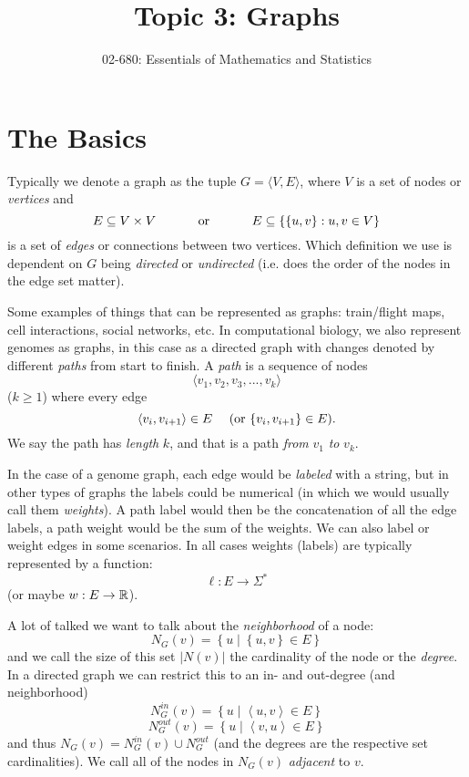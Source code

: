 


\title{Topic 3: Graphs}
\author{02-680: Essentials of Mathematics and Statistics}


\maketitle

\section{The Basics}
Typically we denote a graph as the tuple $G=\langle V, E\rangle$, 
where $V$ is a set of nodes or \emph{vertices} and 
\[E\subseteq V\times V \textnormal{\hspace{3em} or \hspace{3em}} E\subseteq \left\{\left\{u,v\right\} : u,v \in V\right\}\] 
is a set of \emph{edges} or connections between two vertices.
Which definition we use is dependent on $G$ being \emph{directed} or \emph{undirected} (i.e. does the order of the nodes in the edge set matter).  

Some examples of things that can be represented as graphs: train/flight maps, cell interactions, social networks, etc. 
In computational biology, we also represent genomes as graphs, in this case as a directed graph with changes denoted by different \emph{paths} from start to finish. 
A \textit{path} is a sequence of nodes \[\langle v_1, v_2, v_3,...,v_k \rangle\] ($k\ge 1$) where every edge \[\langle v_{i}, v_{i+1}\rangle \in E\textnormal{\hspace{1em} (or  }\{ v_{i}, v_{i+1}\} \in E\textnormal{).}\]
We say the path has \emph{length} $k$, and that is a path \textit{from} $v_1$ \textit{to} $v_k$.

In the case of a genome graph, each edge would be \emph{labeled} with a string, but in other types of graphs the labels could be numerical 
(in which we would usually call them \textit{weights}).
A path label would then be the concatenation of all the edge labels, a path weight would be the sum of the weights. 
We can also label or weight edges in some scenarios. 
In all cases weights (labels) are typically represented by a function:
\[\ell: E \rightarrow \Sigma^* \]
(or maybe $w: E \rightarrow \operatorname{\mathbb{R}}$).

A lot of talked we want to talk about the \emph{neighborhood} of a node: 
\[N_G(v) = \left\{ u \mid \left\{u,v\right\} \in E\right\}\]
and we call the size of this set $\left|N(v)\right|$ the cardinality of the node or the \emph{degree}. 
In a directed graph we can restrict this to an in- and out-degree (and neighborhood)
\[N^{in}_G(v) = \left\{ u \mid \left\langle u,v\right\rangle \in E\right\}\]
\[N^{out}_G(v) = \left\{ u \mid \left\langle v,u\right\rangle \in E\right\}\]
and thus $N_G(v) = N^{in}_G(v) \cup N^{out}_G$ (and the degrees are the respective set cardinalities). 
We call all of the nodes in $N_G(v)$ \emph{adjacent} to $v$. 

